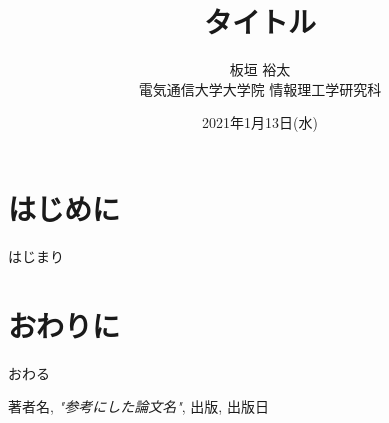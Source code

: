 \documentclass[uplatex, twocolumn,10pt]{jsbook}
\begin{document}
\title{タイトル}
\author{板垣 裕太\\電気通信大学大学院 情報理工学研究科}
\date{2021年1月13日(水)}
\maketitle


\section{はじめに}
はじまり

\section{おわりに}
おわる

\begin{thebibliography}{99}
     著者名, {\it "参考にした論文名"}, 出版, 出版日
\end{thebibliography}
\end{document}
